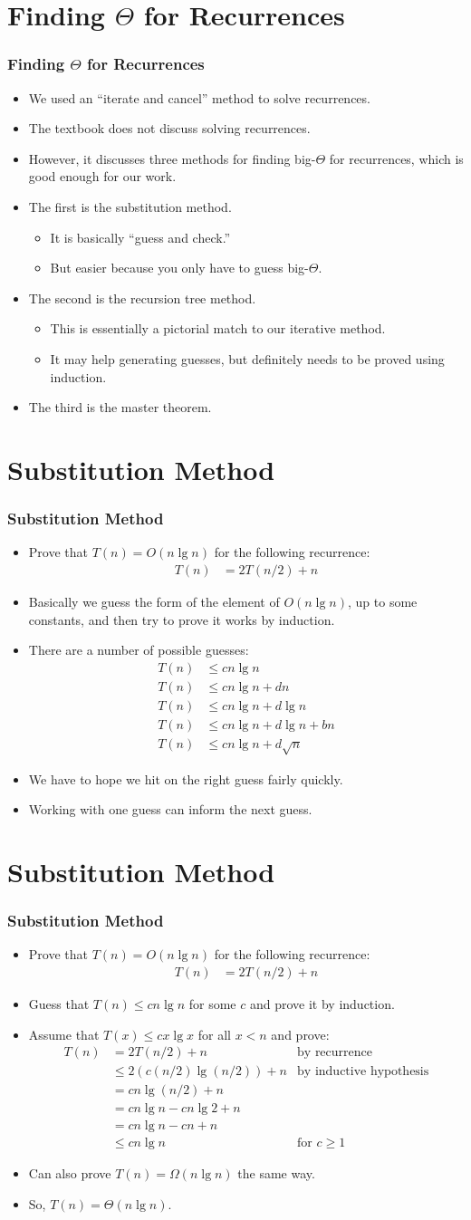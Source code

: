 \documentclass{beamer}
\newcommand{\sect}[1]{
\section{#1}
\begin{frame}[fragile]\frametitle{#1}
}
\newcommand{\bi}{\begin{itemize}}
\newcommand{\ii}{\item}
\newcommand{\ei}{\end{itemize}}
\begin{document}
\sect{Finding $\Theta$ for Recurrences}

\bi
\ii We used an ``iterate and cancel'' method to solve recurrences.
\ii The textbook does not discuss solving recurrences.
\ii However, it discusses three methods for finding big-$\Theta$ for
recurrences, which is good enough for our work.
\ii The first is the substitution method.
\bi
\ii It is basically ``guess and check.''
\ii But easier because you only have to guess big-$\Theta$.
\ei
\ii The second is the recursion tree method.
\bi
\ii This is essentially a pictorial match to our iterative method.
\ii It may help generating guesses, but definitely needs to be proved
using induction.
\ei
\ii The third is the master theorem.
\ei

\end{frame}

\sect{Substitution Method}
\bi
\ii
Prove that $T(n) = O(n\lg n)$ for the following recurrence:
\begin{align*}
T(n) &= 2T(n/2) + n
\end{align*}
\ii
Basically we guess the form of the element of
$O(n\lg n)$, up to some constants,
and then try to prove it works by induction.
\ii
There are a number of possible guesses:
\begin{align*}
  T(n) &\leq cn\lg n\\
  T(n) &\leq cn\lg n + dn\\
  T(n) &\leq cn\lg n + d\lg n\\
  T(n) &\leq cn\lg n + d\lg n + b n\\
  T(n) &\leq cn\lg n + d\sqrt{n}
\end{align*}
\ii
We have to hope we hit on the right guess fairly quickly.
\ii
Working with one guess can inform the next guess.
\ei

\end{frame}

\sect{Substitution Method}
\bi
\ii
Prove that $T(n) = O(n\lg n)$ for the following recurrence:
\begin{align*}
T(n) &= 2T(n/2) + n
\end{align*}
\ii
Guess that $T(n) \leq cn\lg n$ for some $c$ and prove it by induction.
\ii
Assume that $T(x) \leq cx\lg x$ for all $x < n$ and prove:
\begin{align*}
  T(n) &= 2T(n/2) + n & \mbox{by recurrence}\\
  &\leq 2(c(n/2)\lg(n/2)) + n &\mbox{by inductive hypothesis}\\
  &= cn\lg(n/2) + n\\
  &= cn\lg n - cn\lg 2 + n\\
  &= cn\lg n - cn + n\\
  &\leq cn\lg n &\mbox{for $c \geq 1$}
\end{align*}
\ii
Can also prove $T(n) = \Omega(n\lg n)$ the same way.
\ii
So, $T(n) = \Theta(n \lg n)$.
\ei
\end{frame}
\end{document}
